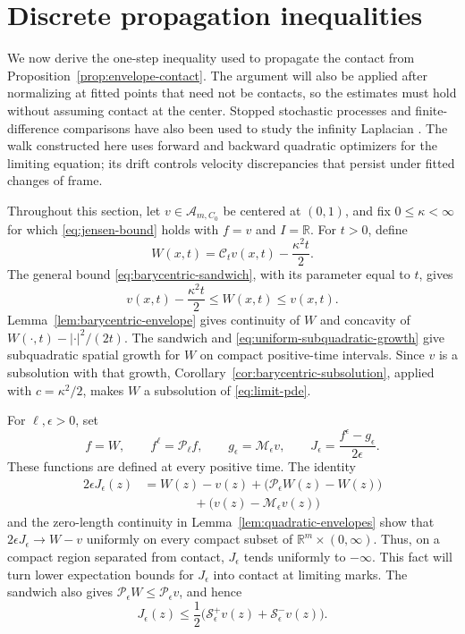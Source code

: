 \documentclass[11pt]{article}
\numberwithin{equation}{section}
\theoremstyle{definition}
\theoremstyle{remark}
\newcommand{\R}{\mathbb{R}}
\newcommand{\Penv}{\mathcal{P}}
\newcommand{\Menv}{\mathcal{M}}
\newcommand{\Cenv}{\mathcal{C}}
\newcommand{\Senv}{\mathcal{S}}
\newcommand{\Aclass}{\mathcal{A}}
\begin{document}
\section{Discrete propagation inequalities}\label{sec:discrete-propagation}

We now derive the one-step inequality used to propagate the contact from
Proposition~\ref{prop:envelope-contact}. The argument will also be applied
after normalizing at fitted points that need not be contacts, so the
estimates must hold without assuming contact at the center.
Stopped stochastic processes and finite-difference comparisons have also
been used to study the infinity Laplacian
\cite{PeresSchrammSheffieldWilson2009,ArmstrongSmart2010}.
The walk constructed here uses forward and backward quadratic optimizers
for the limiting equation; its drift controls velocity discrepancies
that persist under fitted changes of frame.

Throughout this section, let $v\in\Aclass_{m,C_0}$ be centered at $(0,1)$,
and fix $0\le\kappa<\infty$ for which \eqref{eq:jensen-bound} holds with
$f=v$ and $I=\R$.  For $t>0$, define
\[
  W(x,t)=\Cenv_t v(x,t)-\frac{\kappa^2t}{2}.
\]
The general bound \eqref{eq:barycentric-sandwich}, with its parameter equal
to $t$, gives
\[
  v(x,t)-\frac{\kappa^2t}{2}\le W(x,t)\le v(x,t).
\]
Lemma~\ref{lem:barycentric-envelope} gives continuity of $W$ and concavity of
$W(\cdot,t)-|\cdot|^2/(2t)$.  The sandwich and
\eqref{eq:uniform-subquadratic-growth} give subquadratic spatial growth for
$W$ on compact positive-time intervals.  Since $v$ is a subsolution with
that growth, Corollary~\ref{cor:barycentric-subsolution}, applied with
$c=\kappa^2/2$, makes $W$ a subsolution of \eqref{eq:limit-pde}.

For $\ell,\epsilon>0$, set
\begin{equation}\label{eq:dp-auxiliary}
  f=W,\qquad f^\ell=\Penv_\ell f,\qquad
  g_\epsilon=\Menv_\epsilon v,\qquad
  J_\epsilon=\frac{f^\epsilon-g_\epsilon}{2\epsilon}.
\end{equation}
These functions are defined at every positive time.  The identity
\begin{equation}\label{eq:dp-contact-gap}
\begin{split}
  2\epsilon J_\epsilon(z)
  &=W(z)-v(z)+\bigl(\Penv_\epsilon W(z)-W(z)\bigr)\\
  &\hspace{4em}+\bigl(v(z)-\Menv_\epsilon v(z)\bigr)
\end{split}
\end{equation}
and the zero-length continuity in Lemma~\ref{lem:quadratic-envelopes} show
that $2\epsilon J_\epsilon\to W-v$ uniformly on every compact subset of
$\R^m\times(0,\infty)$.  Thus, on a compact region separated from contact,
$J_\epsilon$ tends uniformly to $-\infty$.  This fact will turn lower
expectation bounds for $J_\epsilon$ into contact at limiting marks.
The sandwich also gives $\Penv_\epsilon W\le\Penv_\epsilon v$, and hence
\begin{equation}\label{eq:dp-J-bounds}
  J_\epsilon(z)\le
  \frac12\bigl(\Senv^+_\epsilon v(z)+\Senv^-_\epsilon v(z)\bigr).
\end{equation}
\end{document}
